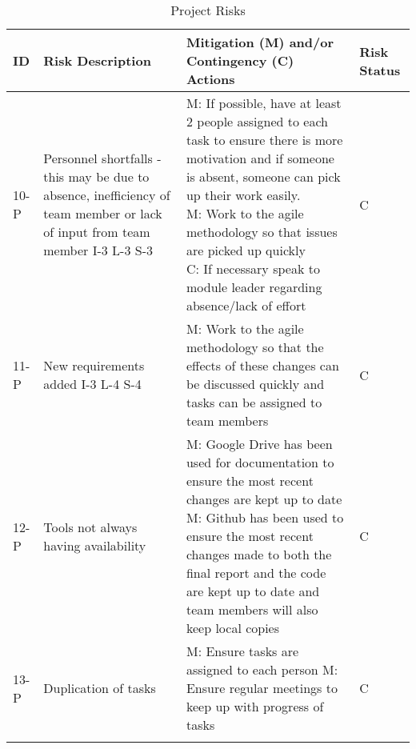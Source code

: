 \newcommand{\specialcell}[2][c]{%
  \begin{tabular}[#1]{@{}p{0.5\textwidth}@{}}#2\end{tabular}}
  
\centering
\begin{longtable}{|p{}|m{}|p{}|p{}|}
    \hline
        \textbf{ID} & \textbf{Risk Description} & \textbf{Mitigation (M) and/or Contingency (C) Actions} & \textbf{Risk Status} \\
    \hline
    10-P & Personnel shortfalls - this may be due to absence, inefficiency of team member or lack of input from team member
    I-3 L-3 S-3 & \specialcell{M: If possible, have at least 2 people assigned to each task to ensure there is more motivation and if someone is absent, someone can pick up their work easily.\\
    M: Work to the agile methodology so that issues are picked up quickly \\
    C: If necessary speak to module leader regarding absence/lack of effort} & C \\
    \hline
    11-P & New requirements added
    I-3 L-4 S-4 & M: Work to the agile methodology so that the effects of these changes can be discussed quickly and tasks can be assigned to team members & C \\
    \hline
    12-P & Tools not always having availability & \specialcell{M: Google Drive has been used for documentation to ensure the most recent changes are kept up to date\\
    M: Github has been used to ensure the most recent changes made to both the final report and the code are kept up to date and team members will also keep local copies} & C \\
    \hline
    13-P & Duplication of tasks & M: Ensure tasks are assigned to each person
    M: Ensure regular meetings to keep up with progress of tasks & C \\
    \hline
    \caption{Project Risks}
    \label{tab:projectrisks}
\end{longtable}

